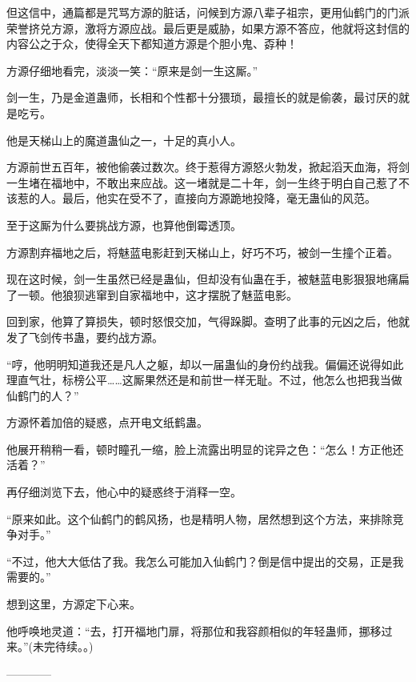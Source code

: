 \begin{this_body}
但这信中，通篇都是咒骂方源的脏话，问候到方源八辈子祖宗，更用仙鹤门的门派荣誉挤兑方源，激将方源应战。最后更是威胁，如果方源不答应，他就将这封信的内容公之于众，使得全天下都知道方源是个胆小鬼、孬种！

方源仔细地看完，淡淡一笑：“原来是剑一生这厮。”

剑一生，乃是金道蛊师，长相和个性都十分猥琐，最擅长的就是偷袭，最讨厌的就是吃亏。

他是天梯山上的魔道蛊仙之一，十足的真小人。

方源前世五百年，被他偷袭过数次。终于惹得方源怒火勃发，掀起滔天血海，将剑一生堵在福地中，不敢出来应战。这一堵就是二十年，剑一生终于明白自己惹了不该惹的人。最后，他实在受不了，直接向方源跪地投降，毫无蛊仙的风范。

至于这厮为什么要挑战方源，也算他倒霉透顶。

方源割弃福地之后，将魅蓝电影赶到天梯山上，好巧不巧，被剑一生撞个正着。

现在这时候，剑一生虽然已经是蛊仙，但却没有仙蛊在手，被魅蓝电影狠狠地痛扁了一顿。他狼狈逃窜到自家福地中，这才摆脱了魅蓝电影。

回到家，他算了算损失，顿时怒恨交加，气得跺脚。查明了此事的元凶之后，他就发了飞剑传书蛊，要约战方源。

“哼，他明明知道我还是凡人之躯，却以一届蛊仙的身份约战我。偏偏还说得如此理直气壮，标榜公平……这厮果然还是和前世一样无耻。不过，他怎么也把我当做仙鹤门的人？”

方源怀着加倍的疑惑，点开电文纸鹤蛊。

他展开稍稍一看，顿时瞳孔一缩，脸上流露出明显的诧异之色：“怎么！方正他还活着？”

再仔细浏览下去，他心中的疑惑终于消释一空。

“原来如此。这个仙鹤门的鹤风扬，也是精明人物，居然想到这个方法，来排除竞争对手。”

“不过，他大大低估了我。我怎么可能加入仙鹤门？倒是信中提出的交易，正是我需要的。”

想到这里，方源定下心来。

他呼唤地灵道：“去，打开福地门扉，将那位和我容颜相似的年轻蛊师，挪移过来。”(未完待续。。)

------------

\end{this_body}

